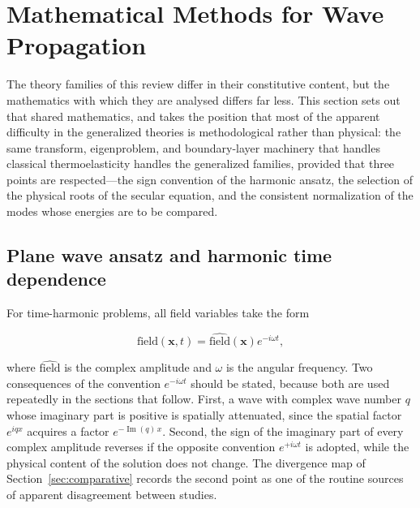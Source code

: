 \section{Mathematical Methods for Wave Propagation}
\label{sec:methods}

The theory families of this review differ in their constitutive content, but the mathematics with which they are analysed differs far less. This section sets out that shared mathematics, and takes the position that most of the apparent difficulty in the generalized theories is methodological rather than physical: the same transform, eigenproblem, and boundary-layer machinery that handles classical thermoelasticity handles the generalized families, provided that three points are respected---the sign convention of the harmonic ansatz, the selection of the physical roots of the secular equation, and the consistent normalization of the modes whose energies are to be compared.

\subsection{Plane wave ansatz and harmonic time dependence}
\label{sec:8.1}

For time-harmonic problems, all field variables take the form

\begin{equation}
\text{field}(\bm{x},t) = \hat{\text{field}}(\bm{x}) e^{-i\omega t},
\label{eq:8.1}
\end{equation}

where $\hat{\text{field}}$ is the complex amplitude and $\omega$ is the angular frequency. Two consequences of the convention $e^{-i\omega t}$ should be stated, because both are used repeatedly in the sections that follow. First, a wave with complex wave number $q$ whose imaginary part is positive is spatially attenuated, since the spatial factor $e^{iqx}$ acquires a factor $e^{-\operatorname{Im}(q)\,x}$. Second, the sign of the imaginary part of every complex amplitude reverses if the opposite convention $e^{+i\omega t}$ is adopted, while the physical content of the solution does not change. The divergence map of Section~\ref{sec:comparative} records the second point as one of the routine sources of apparent disagreement between studies.

